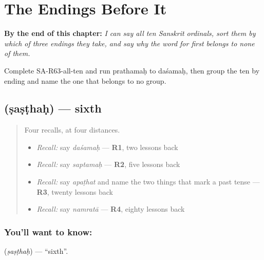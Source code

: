 
\chapter{The Endings Before It}
\label{ch:sa-ordinals-older-endings}

\begin{chapteropening}
\textbf{By the end of this chapter:} \emph{I can say all ten Sanskrit ordinals, sort them by which of three endings they take, and say why the word for first belongs to none of them.}

Complete SA-R63-all-ten and run prathamaḥ to daśamaḥ, then group the ten by ending and name the one that belongs to no group.
\end{chapteropening}

\section[\texorpdfstring{\sk{षष्ठः} (ṣaṣṭhaḥ)}{षष्ठः (ṣaṣṭhaḥ)}]{ (ṣaṣṭhaḥ) — sixth}

\label{lesson:SA-C63-sixth}



\begin{quote}
Four recalls, at four distances.

\begin{itemize}
\raggedright
  \item \emph{Recall:} say \emph{daśamaḥ} — \textbf{R1}, two lessons back
  \item \emph{Recall:} say \emph{saptamaḥ} — \textbf{R2}, five lessons back
  \item \emph{Recall:} say \emph{apaṭhat} and name the two things that mark a past tense — \textbf{R3}, twenty lessons back
  \item \emph{Recall:} say \emph{namratā} — \textbf{R4}, eighty lessons back
\end{itemize}
\end{quote}

\subsection*{You'll want to know: }
\textbf{} (\emph{ṣaṣṭhaḥ}) — \textquotedblleft{}sixth\textquotedblright{}.

